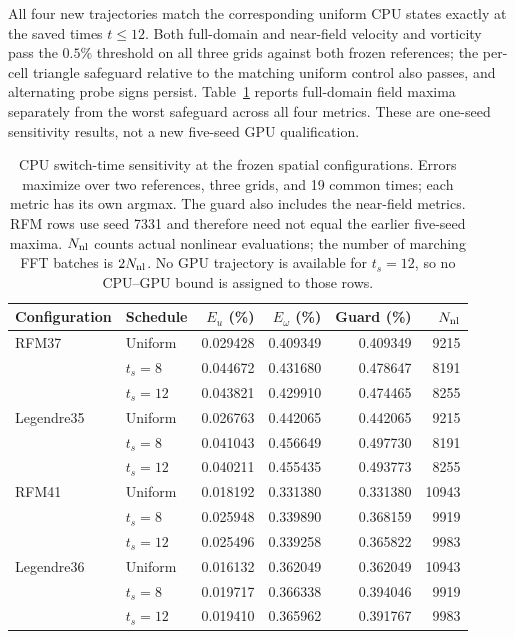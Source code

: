 All four new trajectories match the corresponding uniform CPU states exactly at the saved times $t\le12$. Both full-domain and near-field velocity and vorticity pass the $0.5\%$ threshold on all three grids against both frozen references; the per-cell triangle safeguard relative to the matching uniform control also passes, and alternating probe signs persist. Table~\ref{tab:review-switch12} reports full-domain field maxima separately from the worst safeguard across all four metrics. These are one-seed sensitivity results, not a new five-seed GPU qualification.

\begin{table}[htbp]
\centering\small
\begin{tabular}{llrrrr}
\hline
Configuration & Schedule & $E_u$ (\%) & $E_\omega$ (\%) & Guard (\%) & $N_{\rm nl}$\\
\hline
RFM37 & Uniform & 0.029428 & 0.409349 & 0.409349 & 9215\\
 & $t_s=8$ & 0.044672 & 0.431680 & 0.478647 & 8191\\
 & $t_s=12$ & 0.043821 & 0.429910 & 0.474465 & 8255\\
Legendre35 & Uniform & 0.026763 & 0.442065 & 0.442065 & 9215\\
 & $t_s=8$ & 0.041043 & 0.456649 & 0.497730 & 8191\\
 & $t_s=12$ & 0.040211 & 0.455435 & 0.493773 & 8255\\
RFM41 & Uniform & 0.018192 & 0.331380 & 0.331380 & 10943\\
 & $t_s=8$ & 0.025948 & 0.339890 & 0.368159 & 9919\\
 & $t_s=12$ & 0.025496 & 0.339258 & 0.365822 & 9983\\
Legendre36 & Uniform & 0.016132 & 0.362049 & 0.362049 & 10943\\
 & $t_s=8$ & 0.019717 & 0.366338 & 0.394046 & 9919\\
 & $t_s=12$ & 0.019410 & 0.365962 & 0.391767 & 9983\\
\hline
\end{tabular}
\caption{CPU switch-time sensitivity at the frozen spatial configurations. Errors maximize over two references, three grids, and 19 common times; each metric has its own argmax. The guard also includes the near-field metrics. RFM rows use seed 7331 and therefore need not equal the earlier five-seed maxima. $N_{\rm nl}$ counts actual nonlinear evaluations; the number of marching FFT batches is $2N_{\rm nl}$. No GPU trajectory is available for $t_s=12$, so no CPU--GPU bound is assigned to those rows.}
\label{tab:review-switch12}
\end{table}

